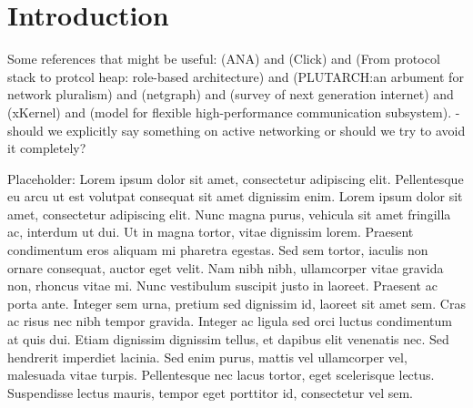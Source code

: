 \documentclass{sig-alternate}
\begin{document}



\section{Introduction}


Some references that might be useful: \cite{ANAJournal} (ANA) and \cite{click} (Click) and \cite{rba} (From protocol stack to protcol heap: role-based architecture) and \cite{Plutarch} (PLUTARCH:an arbument for network pluralism) and \cite{netgraph} (netgraph) and \cite{raj} (survey of next generation internet) and \cite{xKernel} (xKernel) and \cite{Zitterbart} (model for flexible high-performance communication subsystem). - should we explicitly say something on active networking or should we try to avoid it completely?


Placeholder: Lorem ipsum dolor sit amet, consectetur adipiscing elit. Pellentesque eu arcu ut est volutpat consequat sit amet dignissim enim. Lorem ipsum dolor sit amet, consectetur adipiscing elit. Nunc magna purus, vehicula sit amet fringilla ac, interdum ut dui. Ut in magna tortor, vitae dignissim lorem. Praesent condimentum eros aliquam mi pharetra egestas. Sed sem tortor, iaculis non ornare consequat, auctor eget velit. Nam nibh nibh, ullamcorper vitae gravida non, rhoncus vitae mi. Nunc vestibulum suscipit justo in laoreet. Praesent ac porta ante. Integer sem urna, pretium sed dignissim id, laoreet sit amet sem. Cras ac risus nec nibh tempor gravida. Integer ac ligula sed orci luctus condimentum at quis dui. Etiam dignissim dignissim tellus, et dapibus elit venenatis nec. Sed hendrerit imperdiet lacinia. Sed enim purus, mattis vel ullamcorper vel, malesuada vitae turpis. Pellentesque nec lacus tortor, eget scelerisque lectus. Suspendisse lectus mauris, tempor eget porttitor id, consectetur vel sem.
\end{document}
